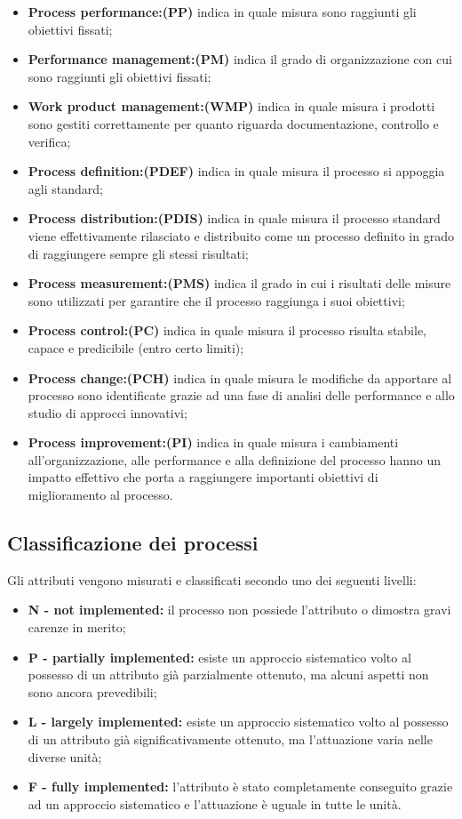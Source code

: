 \documentclass[openany,12pt,a4paper]{report}
\begin{document}
\begin{itemize}
    \item \textbf{Process performance:(PP)} indica in quale misura sono raggiunti gli obiettivi fissati;
    \item \textbf{Performance management:(PM)} indica il grado di organizzazione con cui sono raggiunti gli obiettivi fissati;
    \item \textbf{Work product management:(WMP)} indica in quale misura i prodotti sono gestiti correttamente per quanto riguarda documentazione, controllo e verifica;
    \item \textbf{Process definition:(PDEF)} indica in quale misura il processo si appoggia agli standard; 
    \item \textbf{Process distribution:(PDIS)} indica in quale misura il processo standard viene effettivamente rilasciato e distribuito come un processo definito in grado di raggiungere sempre gli stessi risultati;
    \item \textbf{Process measurement:(PMS)} indica il grado in cui i risultati delle misure sono utilizzati per garantire che il processo raggiunga i suoi obiettivi;
    \item \textbf{Process control:(PC)} indica in quale misura il processo risulta stabile, capace e predicibile (entro certo limiti);
    \item \textbf{Process change:(PCH)} indica in quale misura le modifiche da apportare al processo sono identificate grazie ad una fase di analisi delle performance e allo studio di approcci innovativi;
    \item \textbf{Process improvement:(PI)} indica in quale misura i cambiamenti all'organizzazione, alle performance e alla definizione del processo hanno un impatto effettivo che porta a raggiungere importanti obiettivi di miglioramento al processo.
\end{itemize}

\subsection{Classificazione dei processi}

Gli attributi vengono misurati e classificati secondo uno dei seguenti livelli:

\begin{itemize}
    \item \textbf{N - not implemented:} il processo non possiede l'attributo o dimostra gravi carenze in merito;
    \item \textbf{P - partially implemented:} esiste un approccio sistematico volto al possesso di un attributo già parzialmente ottenuto, ma alcuni aspetti non sono ancora prevedibili;
    \item \textbf{L - largely implemented:} esiste un approccio sistematico volto al possesso di un attributo già significativamente ottenuto, ma l'attuazione varia nelle diverse unità;
    \item \textbf{F - fully implemented:} l'attributo è stato completamente conseguito grazie ad un approccio sistematico e l'attuazione è uguale in tutte le unità.
\end{itemize}
\end{document}
